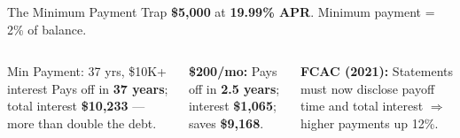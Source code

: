 \documentclass[aspectratio=169]{beamer}
\begin{document}
\begin{frame}{The Minimum Payment Trap}
\textbf{\$5,000} at \textbf{19.99\% APR}. Minimum payment = 2\% of balance.
\begin{columns}
\begin{alertblock}{Min Payment: 37 yrs, \$10K+ interest}
Pays off in \textbf{37 years}; total interest \textbf{\$10,233} --- more than double the debt.
\end{alertblock}
\textcolor{beteal}{\textbf{\$200/mo:}} Pays off in \textbf{2.5 years}; interest \textbf{\$1,065}; saves \textbf{\$9,168}.

\textcolor{bepurple}{\textbf{FCAC (2021):}} Statements must now disclose payoff time and total interest $\Rightarrow$ higher payments up 12\%.
\end{columns}
\end{frame}
\end{document}
